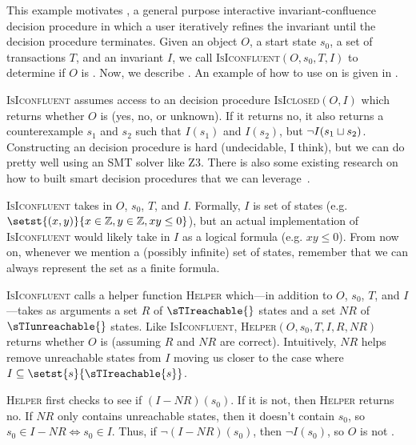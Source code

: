 \newcommand{\IsIconfluent}{\textsc{IsIconfluent}}
\newcommand{\IsIclosed}{\textsc{IsIclosed}}
\newcommand{\Helper}{\textsc{Helper}}

This example motivates , a general
purpose interactive invariant-confluence decision procedure in which a user
iteratively refines the invariant until the decision procedure terminates.
Given an object $O$, a start state $s_0$, a set of transactions $T$, and an
invariant $I$, we call \IsIconfluent$(O, s_0, T, I)$ to determine if $O$ is
\sTIconfluent{}. Now, we describe . An
example of how to use  on
 is given in
.

\IsIconfluent{} assumes access to an \Iclosed{} decision procedure
\IsIclosed$(O, I)$ which returns whether $O$ is \Iclosed{} (yes, no, or
unknown). If it returns no, it also returns a counterexample $s_1$ and $s_2$
such that $I(s_1)$ and $I(s_2)$, but $\lnot I(s_1 \sqcup s_2)$. Constructing an
\Iclosed{} decision procedure is hard (undecidable, I think), but we can do
pretty well using an SMT solver like Z3. There is also some existing research
on how to built smart \Iclosed{} decision procedures that we can
leverage~\cite{li2014automating}.

\IsIconfluent{} takes in $O$, $s_0$, $T$, and $I$. Formally, $I$ is set of
states (e.g. $\setst{(x, y)}{x \in \ints, y \in \ints, xy \leq 0}$), but an
actual implementation of \IsIconfluent{} would likely take in $I$ as a logical
formula (e.g. $xy \leq 0$). From now on, whenever we mention a (possibly
infinite) set of states, remember that we can always represent the set as a
finite formula.

\IsIconfluent{} calls a helper function \Helper{} which---in addition to $O$,
$s_0$, $T$, and $I$---takes as arguments a set $R$ of $\sTIreachable{}$ states
and a set $NR$ of $\sTIunreachable{}$ states. Like \IsIconfluent, \Helper$(O,
s_0, T, I, R, NR)$ returns whether $O$ is \sTIconfluent{} (assuming $R$ and
$NR$ are correct). Intuitively, $NR$ helps remove unreachable states from $I$
moving us closer to the case where $I \subseteq \setst{s}{\sTIreachable{s}}$.

\Helper{} first checks to see if $(I - NR)(s_0)$. If it is not, then \Helper{}
returns no. If $NR$ only contains unreachable states, then it doesn't contain
$s_0$, so $s_0 \in I - NR \iff s_0 \in I$. Thus, if $\lnot (I - NR)(s_0)$, then
$\lnot I(s_0)$, so $O$ is not \sTIconfluent.

